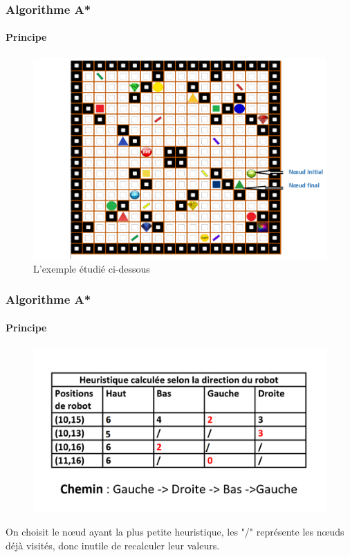 \documentclass[t]{beamer}
\begin{document}
\begin{frame}
\frametitle{Algorithme A*}
\framesubtitle{Principe}
\begin{center}
\begin{figure}[h!]
\centerline{\includegraphics[scale=0.4]{Avant.PNG}}
\caption {L'exemple étudié ci-dessous}
\end{figure}
\end{center}
\end{frame}

\begin{frame}
\frametitle{Algorithme A*}
\framesubtitle{Principe}
\begin{center}
\begin{figure}[h!]
\centerline{\includegraphics[scale=0.5]{heuristique.PNG}}
\end{figure}
\end{center}
\begin{center}
On choisit le nœud ayant la plus petite heuristique, les "/" représente les nœuds déjà visités, donc inutile de recalculer leur valeurs.
\end{center}
\end{frame}
\end{document}
